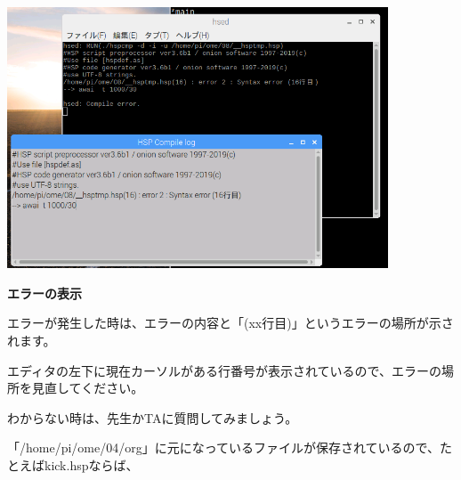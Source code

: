 \documentclass[a4paper,dvipdfmx]{jarticle}
\begin{document}
\bigskip



\begin{center}
\includegraphics[width=11.324cm,height=7.756cm]{text04-img/text04-img011.png}

\end{center}

\bigskip


\bigskip


\bigskip


\bigskip


\bigskip


\bigskip


\bigskip


\bigskip


\bigskip


\bigskip


\bigskip


\bigskip


\bigskip

{\bfseries
エラーの表示}


\bigskip


\bigskip


\bigskip


\bigskip


\bigskip

エラーが発生した時は、エラーの内容と「(xx行目)」というエラーの場所が示されます。

エディタの左下に現在カーソルがある行番号が表示されているので、エラーの場所を見直してください。

わからない時は、先生かTAに質問してみましょう。

「/home/pi/ome/04/org」に元になっているファイルが保存されているので、たとえばkick.hspならば、
\end{document}
